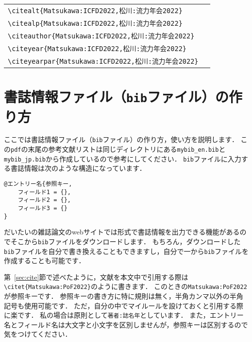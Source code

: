 \documentclass[a4paper,fleqn,uplatex,dvipdfmx]{jsarticle}
\begin{document}
\begin{table}[t]
\begin{tabular}{ll}
        \verb|\citealt{Matsukawa:ICFD2022,松川:流力年会2022}|         &\citealt{Matsukawa:ICFD2022,松川:流力年会2022} \\
        \verb|\citealp{Matsukawa:ICFD2022,松川:流力年会2022}|         &\citealp{Matsukawa:ICFD2022,松川:流力年会2022} \\
        \verb|\citeauthor{Matsukawa:ICFD2022,松川:流力年会2022}|      &\citeauthor{Matsukawa:ICFD2022,松川:流力年会2022} \\
        \verb|\citeyear{Matsukawa:ICFD2022,松川:流力年会2022}|        &\citeyear{Matsukawa:ICFD2022,松川:流力年会2022} \\
        \verb|\citeyearpar{Matsukawa:ICFD2022,松川:流力年会2022}|     &\citeyearpar{Matsukawa:ICFD2022,松川:流力年会2022}
    \end{tabular}
\end{table}


\clearpage
\section{書誌情報ファイル（\texttt{bib}ファイル）の作り方}
\label{sec:bib}
ここでは書誌情報ファイル（\texttt{bib}ファイル）の作り方，使い方を説明します．
この\verb|pdf|の末尾の参考文献リストは同じディレクトリにある\verb|mybib_en.bib|と\verb|mybib_jp.bib|から作成しているので参考にしてください．
\verb|bib|ファイルに入力する書誌情報は次のような構造になっています．
\begin{verbatim}
@エントリー名{参照キー,
    フィールド1 = {},
    フィールド2 = {},
    フィールド3 = {}
}
\end{verbatim}
だいたいの雑誌論文のwebサイトでは\BibTeX{}形式で書誌情報を出力できる機能があるのでそこから\verb|bib|ファイルをダウンロードします．
もちろん，ダウンロードした\verb|bib|ファイルを自分で書き換えることもできますし，自分で一から\verb|bib|ファイルを作成することも可能です．

第~\ref{sec:cite}節で述べたように，文献を本文中で引用する際は\verb|\citet{Matsukawa:PoF2022}|のように書きます．
このときの\verb|Matsukawa:PoF2022|が参照キーです．
参照キーの書き方に特に規則は無く，半角カンマ以外の半角記号も使用可能です．
ただ，自分の中でマイルールを設けておくと引用する際に楽です．
私の場合は原則として\texttt{\colorbox[gray]{0.8}{著者}:\colorbox[gray]{0.8}{誌名}\colorbox[gray]{0.8}{年}}としています．
また，エントリー名とフィールド名は大文字と小文字を区別しませんが，参照キーは区別するので気をつけてください．
\end{document}
